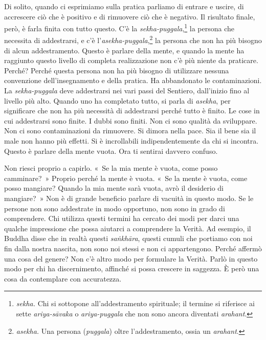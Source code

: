 Di solito, quando ci esprimiamo sulla pratica parliamo di entrare e
uscire, di accrescere ciò che è positivo e di rimuovere ciò che è
negativo. Il risultato finale, però, è farla finita con tutto questo.
C'è la \emph{sekha-puggala},\footnote{\emph{sekha.} Chi si sottopone
  all'addestramento spirituale; il termine si riferisce ai sette
  \emph{ariya-sāvaka} o \emph{ariya-puggala} che non sono ancora diventati
  \emph{arahant}.} la persona che necessita di addestrarsi, e c'è
l'\emph{asekha-puggala},\footnote{\emph{asekha.} Una persona
  (\emph{puggala}) oltre l'addestramento, ossia un \emph{arahant}.} la
persona che non ha più bisogno di alcun addestramento. Questo è parlare
della mente, e quando la mente ha raggiunto questo livello di completa
realizzazione non c'è più niente da praticare. Perché? Perché questa
persona non ha più bisogno di utilizzare nessuna convenzione
dell'insegnamento e della pratica. Ha abbandonato le contaminazioni. La
\emph{sekha-puggala} deve addestrarsi nei vari passi del Sentiero,
dall'inizio fino al livello più alto. Quando uno ha completato tutto, si
parla di \emph{asekha}, per significare che non ha più necessità di
addestrarsi perché tutto è finito. Le cose in cui addestrarsi sono
finite. I dubbi sono finiti. Non ci sono qualità da sviluppare. Non ci
sono contaminazioni da rimuovere. Si dimora nella pace. Sia il bene sia
il male non hanno più effetti. Si è incrollabili indipendentemente da
chi si incontra. Questo è parlare della mente vuota. Ora ti sentirai
davvero confuso.

Non riesci proprio a capirlo. «~Se la mia mente è vuota, come posso
camminare?~» Proprio perché la mente è vuota. «~Se la mente è vuota,
come posso mangiare? Quando la mia mente sarà vuota, avrò il desiderio
di mangiare?~» Non è di grande beneficio parlare di vacuità in questo
modo. Se le persone non sono addestrate in modo opportuno, non sono in
grado di comprendere. Chi utilizza questi termini ha cercato dei modi
per darci una qualche impressione che possa aiutarci a comprendere la
Verità. Ad esempio, il Buddha disse che in realtà questi
\emph{saṅkhāra}, questi cumuli che portiamo con noi fin dalla nostra
nascita, non sono noi stessi e non ci appartengono. Perché affermò una
cosa del genere? Non c'è altro modo per formulare la Verità. Parlò in
questo modo per chi ha discernimento, affinché si possa crescere in
saggezza. È però una cosa da contemplare con accuratezza.

